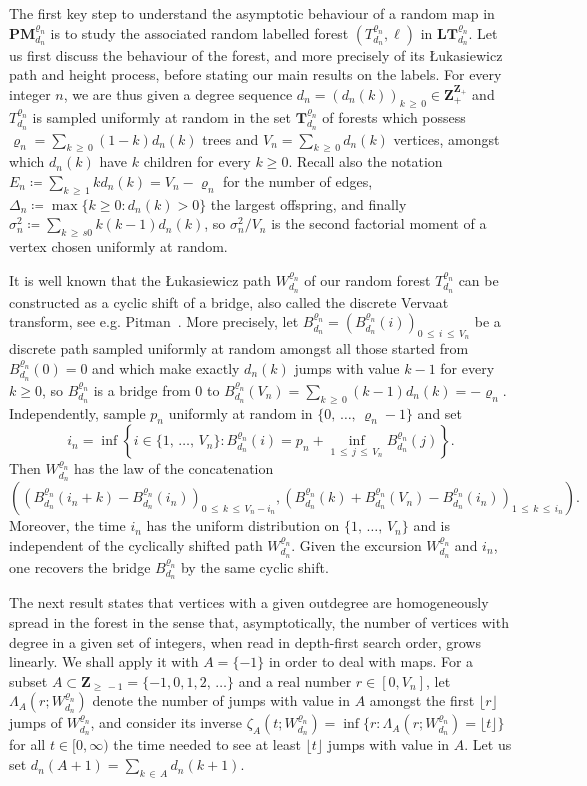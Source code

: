 \documentclass[AHL,Unicode,longabstracts,published]{cedram}
\newcommand{\ensembles}[1]{\mathbf{#1}}
\newcommand{\Z}{\ensembles{Z}}
\newcommand{\1}{\ensembles{1}}
\newcommand{\Tree}{\mathbf{T}}
\newcommand{\PMap}{\mathbf{PM}}
\newcommand{\LTree}{\mathbf{LT}}
\renewcommand{\le}{\leqslant}
\renewcommand{\ge}{\geqslant}
\newcommand{\Fn}{\Tree_{d_n}^{\varrho_n}}
\newcommand{\PMn}{\PMap_{d_n}^{\varrho_n}}
\newcommand{\fn}{T_{d_n}^{\varrho_n}}
\newcommand{\LFn}{\LTree_{d_n}^{\varrho_n}}
\newcommand{\Wfn}{W_{d_n}^{\varrho_n}}
\newcommand{\Bfn}{B_{d_n}^{\varrho_n}}
\newcommand{\edges}{E}
\newcommand{\vertices}{V}
\begin{document}
The first key step to understand the asymptotic behaviour of a random map in $\PMn$ is to study the associated random labelled forest $(\fn, \ell)$ in $\LFn$. Let us first discuss the behaviour of the forest, and more precisely of its \L ukasiewicz path and height process, before stating our main results on the labels. For every integer $n$, we are thus given a degree sequence $d_n = (d_n(k))_{k\,\ge\,0} \in \Z_+^{\Z_+}$ and $\fn$ is sampled uniformly at random in the set $\Fn$ of forests which possess $\varrho_n = \sum_{k\,\ge\,0} (1-k) d_n(k)$ trees and $\vertices_n = \sum_{k\,\ge\,0} d_n(k)$ vertices, amongst which $d_n(k)$ have $k$ children for every $k \ge 0$. Recall also the notation $\edges_n \coloneqq \sum_{k\,\ge\,1} k d_n(k) = \vertices_n - \varrho_n$ for the number of edges, $\Delta_n \coloneqq \max\{k \ge 0 : d_n(k) > 0\}$ the largest offspring, and finally $\sigma_n^2 \coloneqq \sum_{k\,\ge\,s0} k (k-1) d_n(k)$, so $\sigma_n^2/\vertices_n$ is the second factorial moment of a vertex chosen uniformly at random.



It is well known that the {\L}ukasiewicz path $\Wfn$ of our random forest $\fn$ can be constructed as a cyclic shift of a bridge, also called the discrete Vervaat transform, see e.g. Pitman~\cite[Chapter~6]{Pit06}. More precisely, let $\Bfn = (\Bfn(i))_{0\,\le\,i\, \le\,\vertices_n}$ be a discrete path sampled uniformly at random amongst all those started from $\Bfn(0) = 0$ and which make exactly $d_n(k)$ jumps with value $k-1$ for every $k \ge 0$, so $\Bfn$ is a bridge from $0$ to $\Bfn(\vertices_n) = \sum_{k\,\ge\,0} (k - 1) d_n(k) = - \varrho_n$. Independently, sample $p_n$ uniformly at random in $\{0,\,\dots,\,\varrho_n-1\}$ and set
\[
i_n = \inf\left\{i \in\{1,\,\dots, \,\vertices_n\} : \Bfn(i) = p_n + \inf_{1\,\le \,j\,\le\,\vertices_n} \Bfn(j)\right\}.
\]
Then $\Wfn$ has the law of the concatenation
\[
\left(\left(\Bfn(i_n+k) - \Bfn(i_n)\right)_{0 \,\le\,k\,\le\,\vertices_n-i_n}, \left(\Bfn(k) + \Bfn(\vertices_n) - \Bfn(i_n)\right)_{1\,\le\,k\,\le\,i_n}\right).
\]
Moreover, the time $i_n$ has the uniform distribution on $\{1,\,\dots,\,\vertices_n\}$ and is independent of the cyclically shifted path $\Wfn$. Given the excursion $\Wfn$ and $i_n$, one recovers the bridge $\Bfn$ by the same cyclic shift.


The next result states that vertices with a given outdegree are homogeneously spread in the forest in the sense that, asymptotically, the number of vertices with degree in a given set of integers, when read in depth-first search order, grows linearly. We shall apply it with $A = \{-1\}$ in order to deal with maps. For a subset $A \subset \Z_{\ge\,-1} = \{-1, 0, 1, 2,\,\dots\}$ and a real number $r \in [0, \vertices_n]$, let $\Lambda_A(r; \Wfn)$ denote the number of jumps with value in $A$ amongst the first $\lfloor r\rfloor$ jumps of $\Wfn$, and consider its inverse $\zeta_A(t; \Wfn) = \inf\{r : \Lambda_A(r; \Wfn) = \lfloor t\rfloor\}$ for all $t \in [0, \infty)$ the time needed to see at least $\lfloor t\rfloor$ jumps with value in $A$. Let us set $d_n(A + 1) = \sum_{k\,\in\,A} d_n(k+1)$.
\end{document}
